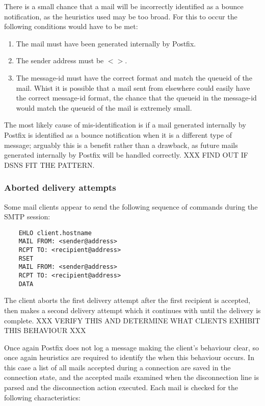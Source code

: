 \documentclass[a4paper,12pt,draft]{article}
\begin{document}
There is a small chance that a mail will be incorrectly identified as a
bounce notification, as the heuristics used may be too broad.  For this to
occur the following conditions would have to be met:

\begin{enumerate}

    \item The mail must have been generated internally by Postfix.

    \item The sender address must be $<>$.

    \item The message-id must have the correct format and match the queueid
        of the mail.  Whist it is possible that a mail sent from elsewhere
        could easily have the correct message-id format, the chance that
        the queueid in the message-id would match the queueid of the mail
        is extremely small.

\end{enumerate}

The most likely cause of mis-identification is if a mail generated
internally by Postfix is identified as a bounce notification when it is a
different type of message; arguably this is a benefit rather than a
drawback, as future mails generated internally by Postfix will be handled
correctly.  XXX FIND OUT IF DSNS FIT THE PATTERN.

\subsubsection{Aborted delivery attempts}

\label{aborted-delivery-attempts}

Some mail clients appear to send the following sequence of commands during
the SMTP session:

\begin{verbatim}
    EHLO client.hostname
    MAIL FROM: <sender@address>
    RCPT TO: <recipient@address>
    RSET
    MAIL FROM: <sender@address>
    RCPT TO: <recipient@address>
    DATA
\end{verbatim}

The client aborts the first delivery attempt after the first recipient is
accepted, then makes a second delivery attempt which it continues with
until the delivery is complete. XXX VERIFY THIS AND DETERMINE WHAT CLIENTS
EXHIBIT THIS BEHAVIOUR XXX

Once again Postfix does not log a message making the client's behaviour
clear, so once again heuristics are required to identify the when this
behaviour occurs.  In this case a list of all mails accepted during a
connection are saved in the connection state, and the accepted mails
examined when the disconnection line is parsed and the disconnection action
executed.  Each mail is checked for the following characteristics:
\end{document}
